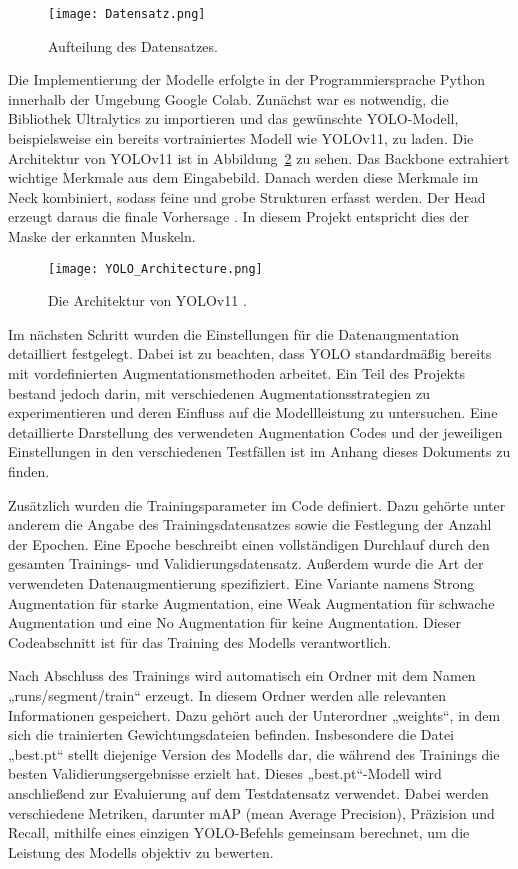 \documentclass[
	german,
	accentcolor=10c,%
	type=intern,
	marginpar=false
	]{tudapub}
\begin{document}
\begin{figure}[H]
    \centering
    \texttt{[image: Datensatz.png]}
    \caption{Aufteilung des Datensatzes.}
    \label{fig:datensatz}
\end{figure}

Die Implementierung der Modelle erfolgte in der Programmiersprache Python innerhalb der Umgebung Google Colab. Zunächst war es notwendig, die Bibliothek Ultralytics zu importieren und das gewünschte YOLO-Modell, beispielsweise ein bereits vortrainiertes Modell wie YOLOv11, zu laden. Die Architektur von YOLOv11 ist in Abbildung~\ref{fig:YOLO_Architecture} zu sehen. Das Backbone extrahiert wichtige Merkmale aus dem Eingabebild. Danach werden diese Merkmale im Neck kombiniert, sodass feine und grobe Strukturen erfasst werden. Der Head erzeugt daraus die finale Vorhersage \cite{Rao2024Oct}. In diesem Projekt entspricht dies der Maske der erkannten Muskeln.

\begin{figure}[H]
    \centering
    \texttt{[image: YOLO\_Architecture.png]}
    \caption{Die Architektur von YOLOv11 \cite{Rao2024Oct}.}
    \label{fig:YOLO_Architecture}
\end{figure}

Im nächsten Schritt wurden die Einstellungen für die Datenaugmentation detailliert festgelegt. Dabei ist zu beachten, dass YOLO standardmäßig bereits mit vordefinierten Augmentationsmethoden arbeitet. Ein Teil des Projekts bestand jedoch darin, mit verschiedenen Augmentationsstrategien zu experimentieren und deren Einfluss auf die Modellleistung zu untersuchen. Eine detaillierte Darstellung des verwendeten Augmentation Codes und der jeweiligen Einstellungen in den verschiedenen Testfällen ist im Anhang dieses Dokuments zu finden.

Zusätzlich wurden die Trainingsparameter im Code definiert. Dazu gehörte unter anderem die Angabe des Trainingsdatensatzes sowie die Festlegung der Anzahl der Epochen. Eine Epoche beschreibt einen vollständigen Durchlauf durch den gesamten Trainings- und Validierungsdatensatz. Außerdem wurde die Art der verwendeten Datenaugmentierung spezifiziert. Eine Variante namens Strong Augmentation für starke Augmentation, eine Weak Augmentation für schwache Augmentation und eine No Augmentation für keine Augmentation. Dieser Codeabschnitt ist für das Training des Modells verantwortlich.

Nach Abschluss des Trainings wird automatisch ein Ordner mit dem Namen „runs/segment/train“ erzeugt. In diesem Ordner werden alle relevanten Informationen gespeichert. Dazu gehört auch der Unterordner „weights“, in dem sich die trainierten Gewichtungsdateien befinden. Insbesondere die Datei „best.pt“ stellt diejenige Version des Modells dar, die während des Trainings die besten Validierungsergebnisse erzielt hat. Dieses „best.pt“-Modell wird anschließend zur Evaluierung auf dem Testdatensatz verwendet. Dabei werden verschiedene Metriken, darunter mAP (mean Average Precision), Präzision und Recall, mithilfe eines einzigen YOLO-Befehls gemeinsam berechnet, um die Leistung des Modells objektiv zu bewerten.
\end{document}

